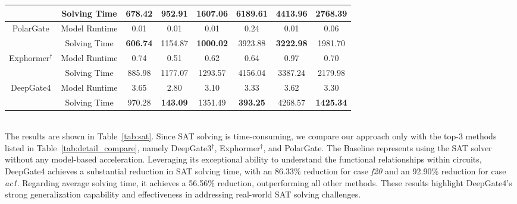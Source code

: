 {\begin{table}[]
\begin{tabular}{@{}c|c|ccccc|c@{}}
 & Solving Time & 678.42 & 952.91 & 1607.06 & 6189.61 & 4413.96 & 2768.39 \\ \midrule
\multirow{2}{*}{PolarGate} & Model Runtime & 0.01 & 0.01 & 0.01 & 0.24 & 0.01 & 0.06 \\
 & Solving Time & \textbf{606.74} & 1154.87 & \textbf{1000.02} & 3923.88 & \textbf{3222.98} & 1981.70 \\ \midrule
\multirow{2}{*}{Exphormer$^\dag$} & Model Runtime & 0.74 & 0.51 & 0.62 & 0.64 & 0.97 & 0.70 \\
 & Solving Time & 885.98 & 1177.07 & 1293.57 & 4156.04 & 3387.24 & 2179.98 \\ \midrule
\multirow{2}{*}{DeepGate4} & Model Runtime & 3.65 & 2.80 & 3.10 & 3.33 & 3.62 & 3.30 \\
 & Solving Time & 970.28 & \textbf{143.09} & 1351.49 & \textbf{393.25} & 4268.57 & \textbf{1425.34} \\ \bottomrule
\end{tabular}
\end{table}
\\
The results are shown in Table~\ref{tab:sat}. Since SAT solving is time-consuming, we compare our approach only with the top-3 methods listed in Table~\ref{tab:detail_compare}, namely DeepGate3$^\dag$, Exphormer$^\dag$, and PolarGate. The Baseline represents using the SAT solver without any model-based acceleration. Leveraging its exceptional ability to understand the functional relationships within circuits, DeepGate4 achieves a substantial reduction in SAT solving time, with an 86.33\% reduction for case \textit{f20} and an 92.90\% reduction for case \textit{ac1}. Regarding average solving time, it achieves a 56.56\% reduction, outperforming all other methods. These results highlight DeepGate4’s strong generalization capability and effectiveness in addressing real-world SAT solving challenges.
}